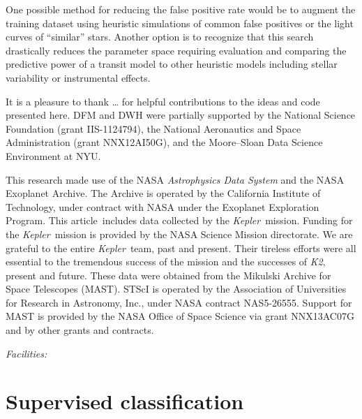 \documentclass[12pt,preprint]{aastex}
\newcommand{\project}[1]{\textsl{#1}}
\newcommand{\kepler}{\project{Kepler}}
\newcommand{\KT}{\project{K2}}
\newcommand{\paper}{article}
\newcommand{\figlabel}[1]{\label{fig:#1}}
\begin{document}
One possible method for reducing the false positive rate would be to augment
the training dataset using heuristic simulations of common false positives or
the light curves of ``similar'' stars.
Another option is to recognize that this search drastically reduces the
parameter space requiring evaluation and comparing the predictive power of
a transit model to other heuristic models including stellar variability or
instrumental effects.


\acknowledgments
It is a pleasure to thank
\ldots
for helpful contributions to the ideas and code presented here.
DFM and DWH were partially supported by the National Science Foundation
(grant IIS-1124794),
the National Aeronautics and Space Administration
(grant NNX12AI50G), and the Moore--Sloan Data Science Environment at NYU.

This research made use of the NASA \project{Astrophysics Data System} and the
NASA Exoplanet Archive.
The Archive is operated by the California Institute of Technology, under
contract with NASA under the Exoplanet Exploration Program.
This \paper\ includes data collected by the \kepler\ mission. Funding for the
\kepler\ mission is provided by the NASA Science Mission directorate.
We are grateful to the entire \kepler\ team, past and present.
Their tireless efforts were all essential to the tremendous success of the mission
and the successes of \KT, present and future.
These data were obtained from the Mikulski Archive for Space Telescopes
(MAST).
STScI is operated by the Association of Universities for Research in
Astronomy, Inc., under NASA contract NAS5-26555.
Support for MAST is provided by the NASA Office of Space Science via grant
NNX13AC07G and by other grants and contracts.

{\it Facilities:} 

\appendix

\section{Supervised classification}


\clearpage

\clearpage


\end{document}
